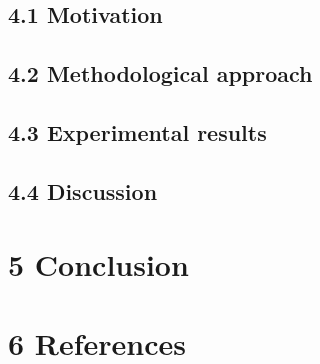 \documentclass[authoryear,review,3p]{elsarticle}
\begin{document}
\subsection*{4.1 Motivation}
\subsection*{4.2 Methodological approach}
\subsection*{4.3 Experimental results}
\subsection*{4.4 Discussion}




\section*{5 Conclusion}






\bigskip
\section*{6 References}



\end{document}

